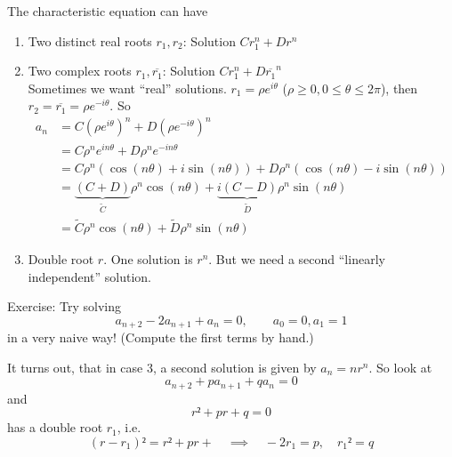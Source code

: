 \documentclass[english]{lbscript}
\begin{document}
The characteristic equation can have
\begin{enumerate}[label=\arabic{*})]
  \item\label{item:18} Two distinct real roots \(r_1, r_2\): Solution \(C r_1^{n}+Dr^{n}\)
  \item\label{item:19} Two complex roots \(r_1, \overline{r_1}\): Solution \(C r_1^{n} + D \overline{r_1}^{n}\)\\
  Sometimes we want \enquote{real} solutions. \(r_1=𝜌e^{i𝜃}\) (\(𝜌≥0, 0≤𝜃≤2𝜋\)), then \(r_2= \overline{r_1}= 𝜌 e^{-i𝜃}\).
  So
  \begin{align}
    \label{eq:72}
    a_n
     & = C\left(𝜌 e^{i𝜃} \right)^{n}+D\left(𝜌 e^{-i𝜃} \right)^{n}                                       \\
     & = C 𝜌^{n} e^{in𝜃}+D𝜌^{n}e^{-in𝜃}                                                                 \\
     & = C 𝜌^{n} \left(\cos(n𝜃)+i\sin(n𝜃) \right)  + D𝜌^{n}\left(\cos(n𝜃)-i\sin(n𝜃) \right)             \\
     & = \underbrace{(C+D)}_{\tilde{C}} 𝜌^{n} \cos(n𝜃) + \underbrace{i(C-D)}_{\tilde{D}} 𝜌^{n} \sin(n𝜃) \\
     & = \tilde{C} 𝜌^{n} \cos(n𝜃)+\tilde{D} 𝜌^{n} \sin(n𝜃)
  \end{align}

  \item\label{item:20} Double root \(r\). One solution is \(r^{n}\). But we need a second \enquote{linearly independent} solution.
\end{enumerate}

\begin{example}{}{}
  Exercise: Try solving
  \begin{equation}
    \label{eq:73}
    a_{n+2}-2a_{n+1} + a_{n} = 0, \quad \quad a_0=0, a_1=1
  \end{equation}
  in a very naive way! (Compute the first terms by hand.)
\end{example}

It turns out, that in case 3, a second solution is given by \(a_n=n r^{n}\). So look at
\begin{equation}
  \label{eq:74}
  a_{n+2} + p a_{n+1} + q a_n = 0
\end{equation}
and
\begin{equation}
  \label{eq:75}
  r²+pr+q=0
\end{equation}
has a double root \(r_1\), i.e.
\begin{equation}
  \label{eq:76}
  (r-r_1)² = r²+pr+\quad ⟹\quad -2r_1=p, \quad r_1²=q
\end{equation}
\end{document}

